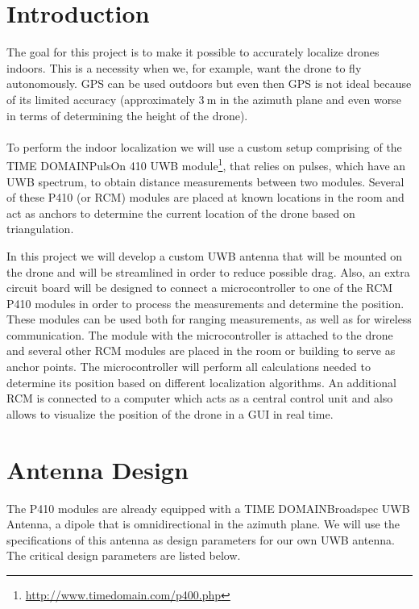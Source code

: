 \documentclass[a4paper]{article}        %
\begin{document}

\newpage
  \tableofcontents
\newpage

\section{Introduction}

The goal for this project is to make it possible to accurately localize drones indoors. This is a necessity when we, for example, want the drone to fly autonomously. GPS can be used outdoors but even then GPS is not ideal because of its limited accuracy (approximately $\SI{3}{\meter}$ in the azimuth plane and even worse in terms of determining the height of the drone). \\\\
To perform the indoor localization we will use a custom setup comprising of the TIME DOMAIN\texttrademark PulsOn 410 UWB module\footnote{\url{http://www.timedomain.com/p400.php}}, that relies on pulses, which have an UWB spectrum, to obtain distance measurements between two modules. Several of these P410 (or RCM) modules are placed at known locations in the room and act as anchors to determine the current location of the drone based on triangulation.

 In this project we will develop a custom UWB antenna that will be mounted on the drone and will be streamlined in order to reduce possible drag. Also, an extra circuit board will be designed to connect a microcontroller to one of the RCM P410 modules in order to process the measurements and determine the position. These modules can be used both for ranging measurements, as well as for wireless communication. The module with the microcontroller is attached to the drone and several other RCM modules are placed in the room or building to serve as anchor points. The microcontroller will perform all calculations needed to determine its position based on different localization algorithms. An additional RCM is connected to a computer which acts as a central control unit and also allows to visualize the position of the drone in a GUI in real time. 

\section{Antenna Design}
	
	 The P410 modules are already equipped with a TIME DOMAIN\texttrademark Broadspec UWB Antenna, a dipole that is omnidirectional in the azimuth plane. We will use the specifications of this antenna as design parameters for our own UWB antenna. The critical design parameters are listed below. 
\end{document}
